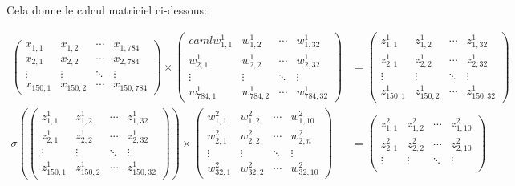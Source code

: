 \documentclass[11pt]{book}
\begin{document}
Cela donne le calcul matriciel ci-dessous:
\begin{footnotesize}
\begin{align*}
\begin{pmatrix}
x_{1,1} & x_{1,2} & \cdots & x_{1,784} \\
x_{2,1} & x_{2,2} & \cdots & x_{2,784} \\
\vdots  & \vdots  & \ddots & \vdots  \\
x_{150,1} & x_{150,2} & \cdots & x_{150,784} 
\end{pmatrix}
\times
\begin{pmatrix}caml
w^1_{1,1} & w^1_{1,2} & \cdots & w^1_{1,32} \\
w^1_{2,1} & w^1_{2,2} & \cdots & w^1_{2,32} \\
\vdots  & \vdots  & \ddots & \vdots  \\
w^1_{784,1} & w^1_{784,2} & \cdots & w^1_{784,32} 
\end{pmatrix}
&= 
\begin{pmatrix}
z^1_{1,1} & z^1_{1,2} & \cdots & z^1_{1,32} \\
z^1_{2,1} & z^1_{2,2} & \cdots & z^1_{2,32} \\
\vdots  & \vdots  & \ddots & \vdots  \\
z^1_{150,1} & z^1_{150,2} & \cdots & z^1_{150,32} 
\end{pmatrix}
\\
\sigma(
\begin{pmatrix}
z^1_{1,1} & z^1_{1,2} & \cdots & z^1_{1,32} \\
z^1_{2,1} & z^1_{2,2} & \cdots & z^1_{2,32} \\
\vdots  & \vdots  & \ddots & \vdots  \\
z^1_{150,1} & z^1_{150,2} & \cdots & z^1_{150,32} 
\end{pmatrix}
)
\times
\begin{pmatrix}
w^2_{1,1} & w^2_{1,2} & \cdots & w^2_{1,10} \\
w^2_{2,1} & w^2_{2,2} & \cdots & w^2_{2,n} \\
\vdots  & \vdots  & \ddots & \vdots  \\
w^2_{32,1} & w^2_{32,2} & \cdots & w^2_{32,10} 
\end{pmatrix}
&= 
\begin{pmatrix}
z^2_{1,1} & z^2_{1,2} & \cdots & z^2_{1,10} \\
z^2_{2,1} & z^2_{2,2} & \cdots & z^2_{2,10} \\
\vdots  & \vdots  & \ddots & \vdots  \\

\end{pmatrix}
\end{align*}
\end{footnotesize}
\end{document}

